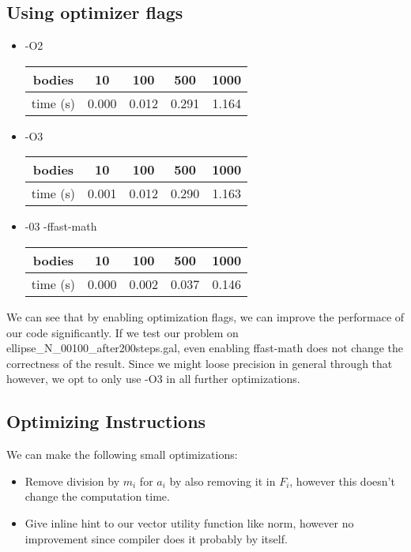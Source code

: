 \documentclass[a4paper]{scrartcl}
\begin{document}
        \subsection{Using optimizer flags}
        \begin{itemize}
            \item -O2
                \noindent\begin{tabular}{c|c|c|c|c}
                    bodies & 10 & 100 & 500 & 1000 \\
                    \hline
                    time (s) & 0.000 & 0.012 & 0.291 & 1.164\\
                \end{tabular}
            \item -O3
                \noindent\begin{tabular}{c|c|c|c|c}\label{tab:baseO3}
                    bodies & 10 & 100 & 500 & 1000 \\
                    \hline
                    time (s) & 0.001 & 0.012 & 0.290 & 1.163\\
                \end{tabular}
            \item -03 -ffast-math
                \noindent\begin{tabular}{c|c|c|c|c}
                    bodies & 10 & 100 & 500 & 1000 \\
                    \hline
                    time (s) & 0.000 & 0.002 & 0.037 & 0.146\\
                \end{tabular}
        \end{itemize}

        We can see that by enabling optimization flags, we can improve the
        performace of our code significantly. If we test our problem on
        ellipse\_N\_00100\_after200steps.gal, even enabling ffast-math does not
        change the correctness of the result. Since we might loose precision in
        general through that however, we opt to only use -O3 in all further
        optimizations.


        \subsection{Optimizing Instructions}
            We can make the following small optimizations:
            \begin{itemize}
                \item Remove division by $m_i$ for $a_i$ by also removing it in $F_i$, however this doesn't change the computation time.
                \item Give inline hint to our vector utility function like norm, however no improvement since compiler does it probably by itself.
            \end{itemize}
\end{document}

